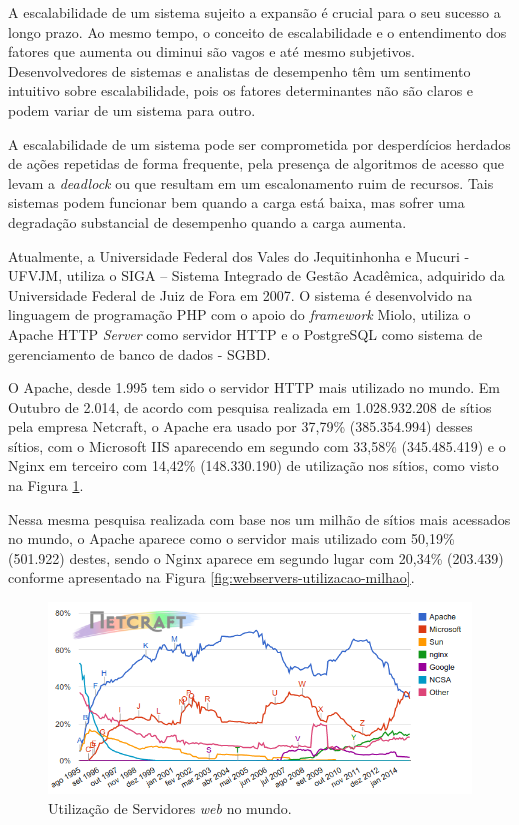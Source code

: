 A escalabilidade de um sistema sujeito a expansão é crucial para o seu 
sucesso a longo prazo. Ao mesmo tempo, o conceito de escalabilidade e o 
entendimento dos fatores que aumenta ou diminui são vagos e até mesmo 
subjetivos. Desenvolvedores de sistemas e analistas de desempenho têm um 
sentimento intuitivo sobre escalabilidade, pois os fatores determinantes não 
são claros e podem variar de um sistema para outro.

A escalabilidade de um sistema pode ser comprometida por desperdícios herdados 
de ações repetidas de forma frequente, pela presença de algoritmos de acesso 
que levam a \textit{deadlock} ou que resultam em um escalonamento ruim de 
recursos. Tais sistemas podem funcionar bem quando a carga está baixa, mas 
sofrer uma degradação substancial de desempenho quando a carga aumenta.

Atualmente, a Universidade Federal dos Vales do Jequitinhonha e Mucuri - UFVJM, 
utiliza o SIGA – Sistema Integrado de Gestão Acadêmica, 
adquirido da Universidade Federal de Juiz de Fora em 2007. O sistema é 
desenvolvido na linguagem de programação PHP com o apoio do \textit{framework} 
Miolo, utiliza o Apache HTTP \textit{Server} como servidor HTTP e o PostgreSQL 
como sistema de gerenciamento de banco de dados - SGBD.

O Apache, desde 1.995 tem sido o servidor HTTP mais utilizado no mundo. Em 
Outubro de 2.014, de acordo com pesquisa realizada em 1.028.932.208 de sítios 
pela empresa Netcraft, o Apache era usado por 37,79\% (385.354.994) desses 
sítios, com o Microsoft IIS aparecendo em segundo com 33,58\% (345.485.419) e o 
Nginx em terceiro com 14,42\% (148.330.190) de utilização nos sítios, como 
visto na Figura \ref{fig:webservers-utilizacao}.

Nessa mesma pesquisa realizada com base nos um milhão de sítios mais acessados 
no mundo, o Apache aparece como o servidor mais utilizado com 50,19\% 
(501.922) destes, sendo o Nginx aparece em segundo lugar com 20,34\% 
(203.439) conforme apresentado na Figura \ref{fig:webservers-utilizacao-milhao}.

\begin{figure}[htb]
	\centering
	\includegraphics[width=1\linewidth]{figuras/grafico1}
	\caption{Utilização de Servidores \textit{web} no mundo.}
	\label{fig:webservers-utilizacao}
\end{figure}

